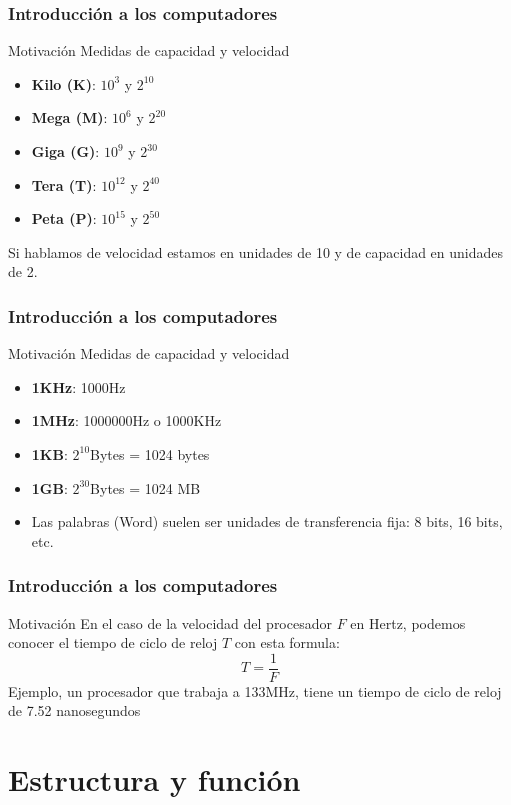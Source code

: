 \documentclass{beamer}
\begin{document}
	\begin{frame}
 		\frametitle{Introducción a los computadores}
		\begin{block}{Motivación}
		Medidas de capacidad y velocidad
		\begin{itemize}
			\item \textbf{Kilo (K)}: $10^3$ y $2^{10}$
			\item \textbf{Mega (M)}: $10^6$ y $2^{20}$
			\item \textbf{Giga (G)}: $10^9$ y $2^{30}$
			\item \textbf{Tera (T)}: $10^{12}$ y $2^{40}$
			\item \textbf{Peta (P)}: $10^{15}$ y $2^{50}$
		\end{itemize}
		Si hablamos de velocidad estamos en unidades de 10 y de capacidad en unidades de 2.
		\end{block}
	\end{frame}	
	
	\begin{frame}
 		\frametitle{Introducción a los computadores}
		\begin{block}{Motivación}
		Medidas de capacidad y velocidad
		\begin{itemize}
			\item \textbf{1KHz}: 1000Hz
			\item \textbf{1MHz}: 1000000Hz o 1000KHz
			\item \textbf{1KB}: $2^{10}$Bytes = 1024 bytes
			\item \textbf{1GB}: $2^{30}$Bytes = 1024 MB
			\item Las palabras (Word) suelen ser unidades de transferencia fija: 8 bits, 16 bits, etc.
		\end{itemize}
		\end{block}
	\end{frame}		
	
	\begin{frame}
 		\frametitle{Introducción a los computadores}
		\begin{block}{Motivación}
		En el caso de la velocidad del procesador $F$ en Hertz, podemos conocer el tiempo de ciclo de reloj $T$ con esta formula:
		\begin{equation*}
		T = \frac{1}{F}
		\end{equation*}
		Ejemplo, un procesador que trabaja a 133MHz, tiene un tiempo de ciclo de reloj de 7.52 nanosegundos
		\end{block}
	\end{frame}	
\section{Estructura y función}
\end{document}
